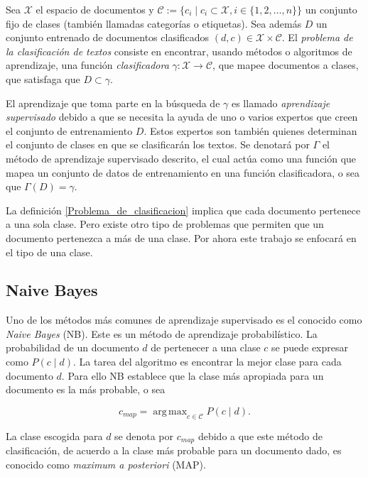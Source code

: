 \documentclass{llncs}
\DeclareMathOperator*{\argmax}{arg\,max}
\begin{document}
	\begin{definition} \label{Problema_de_clasificacion}
		Sea $\mathcal{{X}}$ el espacio de documentos y $\mathcal{C} := \{c_i \mid c_i \subset \mathcal{X}, i \in \{ 1,2,\dots,n\} \}$ un conjunto fijo de clases (tambi\'en llamadas categor\'ias o etiquetas). Sea adem\'as $D$ un conjunto entrenado de documentos clasificados $(d,c) \in \mathcal X \times \mathcal{C}$. El \emph{problema de la clasificaci\'on de textos} consiste en encontrar, usando m\'etodos o algoritmos de aprendizaje, una funci\'on \emph{clasificadora} $\gamma : \mathcal{X} \rightarrow \mathcal{C}$, que mapee documentos a clases, que satisfaga que $D \subset \gamma$. 	

	\end{definition}
	
	El aprendizaje que toma parte en la b\'usqueda de $\gamma$ es llamado \emph{aprendizaje supervisado} debido a que se necesita la ayuda de uno o varios expertos que creen el conjunto de entrenamiento $D$. Estos expertos son  tambi\'en quienes determinan el conjunto de clases en que se clasificar\'an los textos. Se denotar\'a  por $\Gamma$ el m\'etodo de aprendizaje supervisado descrito, el cual act\'ua como una funci\'on que mapea un conjunto de datos de entrenamiento en una funci\'on clasificadora, o sea que $\Gamma(D) = \gamma$.
	
	La definici\'on \ref{Problema_de_clasificacion} implica que cada documento pertenece a una sola clase. Pero existe otro tipo de problemas que permiten que un documento pertenezca a m\'as de una clase. Por ahora este trabajo se enfocar\'a en el tipo de una clase.
	


	\subsection{Naive Bayes}

		Uno de los m\'etodos m\'as comunes de aprendizaje supervisado es el conocido como \emph{Naive Bayes} (NB). Este es un m\'etodo de aprendizaje probabil\'istico. La probabilidad de un documento $d$ de pertenecer a una clase $c$ se puede expresar como $P(c\mid d)$. La tarea del algoritmo es encontrar la mejor clase para cada documento $d$. Para ello NB establece que la clase m\'as apropiada para un documento es la m\'as probable, o sea
		
		\[
		c_{map} = \argmax_{c\in\mathcal{C}} P(c \mid d).
		\]
		
		La clase escogida para $d$ se denota por $c_{map}$ debido a que este m\'etodo de clasificaci\'on, de acuerdo a la clase m\'as probable para un documento dado, es conocido como \emph{maximum a posteriori} (MAP).
		
\end{document}
